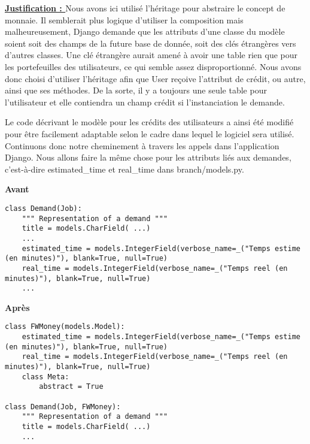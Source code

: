 \textbf{\underline{Justification : }} Nous avons ici utilisé l'héritage pour abstraire le concept de monnaie.  Il semblerait plus logique d'utiliser la composition mais malheureusement,  Django demande que les attributs d'une classe du modèle soient soit des champs de la future base de donnée,  soit des clés étrangères vers d'autres classes.  Une clé étrangère aurait amené à avoir une table rien que pour les portefeuilles des utilisateurs,  ce qui semble assez disproportionné.  Nous avons donc choisi d'utiliser l'héritage afin que User reçoive l'attribut de crédit,  ou autre,  ainsi que ses méthodes.  De la sorte,  il y a toujours une seule table pour l'utilisateur et elle contiendra un champ crédit si l'instanciation le demande.

Le code décrivant le modèle pour les crédits des utilisateurs a ainsi été modifié pour être facilement adaptable selon le cadre dans lequel le logiciel sera utilisé.  Continuons donc notre cheminement à travers les appels dans l'application Django.  Nous allons faire la même chose pour les attributs liés aux demandes,  c'est-à-dire estimated\_time et real\_time dans branch/models.py.  

\begin{minipage}{.5\textwidth}
\begin{center} \textbf{Avant}\end{center}
\begin{lstlisting}
class Demand(Job):
    """ Representation of a demand """
    title = models.CharField( ...)
    ...
    estimated_time = models.IntegerField(verbose_name=_("Temps estime (en minutes)"), blank=True, null=True)
    real_time = models.IntegerField(verbose_name=_("Temps reel (en minutes)"), blank=True, null=True)
    ...
\end{lstlisting} 
\end{minipage}
\hspace{0.3cm}
\begin{minipage}{.5\textwidth}
\begin{center} \textbf{Après}\end{center}
\begin{lstlisting}
class FWMoney(models.Model):
    estimated_time = models.IntegerField(verbose_name=_("Temps estime (en minutes)"), blank=True, null=True)
    real_time = models.IntegerField(verbose_name=_("Temps reel (en minutes)"), blank=True, null=True)
    class Meta:
        abstract = True

class Demand(Job, FWMoney):
    """ Representation of a demand """
    title = models.CharField( ...)
    ...
\end{lstlisting} 
\end{minipage}

